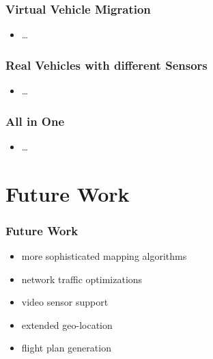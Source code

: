 \documentclass{beamer}
\begin{document}
\begin{frame}\frametitle{Virtual Vehicle Migration} %
\begin{itemize}
\item \ldots
\end{itemize} 
\end{frame}


\begin{frame}\frametitle{Real Vehicles with different Sensors} %
\begin{itemize}
\item \ldots
\end{itemize} 
\end{frame}



\begin{frame}\frametitle{All in One} %
\begin{itemize}
\item \ldots
\end{itemize} 
\end{frame}

\section{Future Work}

\begin{frame}\frametitle{Future Work} %
	\begin{itemize}
		\item more sophisticated mapping algorithms
		\item network traffic optimizations
		\item video sensor support
		\item extended geo-location
		\item flight plan generation
	\end{itemize}
\end{frame}
 
\end{document}
